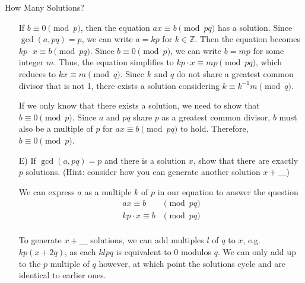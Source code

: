 \begin{homeworkProblem}{How Many Solutions?}
\begin{itemize}
        If $b \equiv 0 \pmod{p}$, then the equation $ax \equiv b \pmod{pq}$ has a solution. 
        Since $\gcd(a, pq) = p$, we can write $a = kp$ for $k \in \mathbb{Z}$. Then the equation becomes 
        $kp \cdot x \equiv b \pmod{pq}$. Since $b \equiv 0 \pmod{p}$, we can write $b = mp$ for some integer $m$. 
        Thus, the equation simplifies to $kp \cdot x \equiv mp \pmod{pq}$, which reduces to $kx \equiv m \pmod{q}$. 
        Since $k$ and $q$ do not share a greatest common divisor that is not 1, there 
        exists a solution considering $k \equiv k^{-1}m \pmod{q}$.

        If we only know that there exists a solution, we need to show that $b
        \equiv 0 \pmod{p}$. Since $a$ and $pq$ share $p$ as a greatest common 
        divisor, $b$ must also be a multiple of $p$ for $ax \equiv b \pmod{pq}$ 
        to hold. Therefore, $b \equiv 0 \pmod{p}$.


        \item[E)] If $\gcd(a, pq) = p$ and there is a solution $x$, show that there
        are exactly $p$ solutions. (Hint: consider how you can generate another solution
        $x + \_\_\_$)

        We can express $a$ as a multiple $k$ of $p$ in our equation to answer
        the question
        \[
            \begin{split}
                ax \equiv b & \pmod{pq} \\
                kp \cdot x \equiv b & \pmod{pq} \\
            \end{split} 
        \]

        To generate $x + \_\_\_$ solutions, we can add multiples $l$ of $q$ to 
        $x$, e.g. $kp(x + 2q)$, as each $klpq$ is equivalent to 0 modulos $q$. 
        We can only add up to the $p$ multiple of $q$ however, at which point 
        the solutions cycle and are identical to earlier ones.  


\end{itemize}
\end{homeworkProblem}
